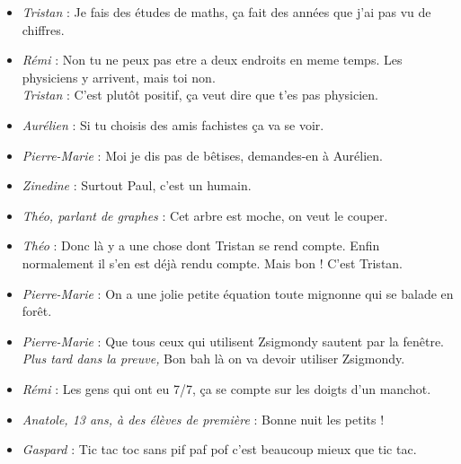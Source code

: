 \setlength{\parindent}{0cm}



\begin{itemize}

\item \textit{Tristan} : \og Je fais des études de maths, ça fait des années que j'ai pas vu de chiffres. \fg

\item \textit{Rémi} : \og Non tu ne peux pas etre a deux endroits en meme temps. Les physiciens y arrivent, mais toi non. \fg \\
\textit{Tristan} : \og C'est plutôt positif, ça veut dire que t'es pas physicien. \fg

\item \textit{Aurélien} : \og Si tu choisis des amis fachistes ça va se voir. \fg

\item \textit{Pierre-Marie} : \og Moi je dis pas de bêtises, demandes-en à Aurélien. \fg

\item \textit{Zinedine} : \og Surtout Paul, c'est un humain. \fg

\item \textit{Théo, parlant de graphes} : \og Cet arbre est moche, on veut le couper. \fg

\item \textit{Théo} : \og Donc là y a une chose dont Tristan se rend compte. Enfin normalement il s'en est déjà rendu compte. Mais bon ! C'est Tristan. \fg

\item \textit{Pierre-Marie} : \og On a une jolie petite équation toute mignonne qui se balade en forêt. \fg

\item \textit{Pierre-Marie} : \og Que tous ceux qui utilisent Zsigmondy sautent par la fenêtre. \fg \\
\textit{Plus tard dans la preuve,} Bon bah là on va devoir utiliser Zsigmondy.

\item \textit{Rémi} : \og Les gens qui ont eu 7/7, ça se compte sur les doigts d'un manchot. \fg

\item \textit{Anatole, 13 ans, à des élèves de première} : \og Bonne nuit les petits ! \fg

\item \textit{Gaspard} : \og Tic tac toc sans pif paf pof c'est beaucoup mieux que tic tac. \fg


\end{itemize}
